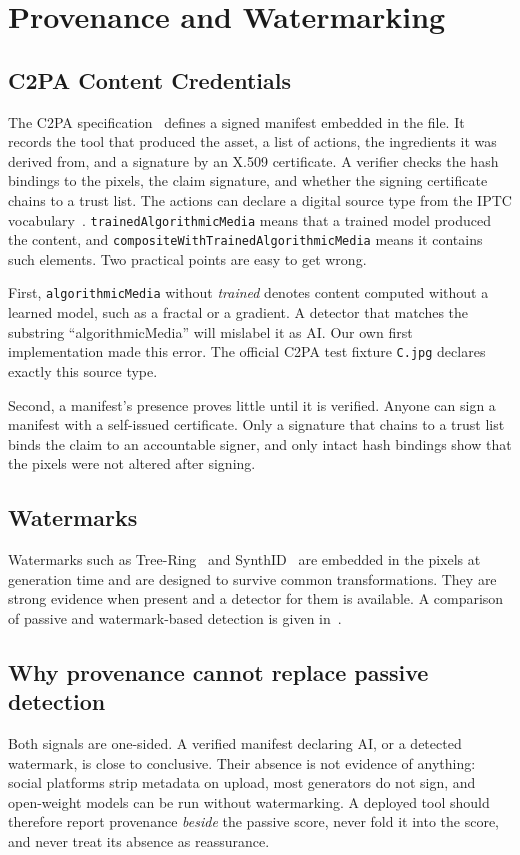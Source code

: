 \documentclass[conference]{IEEEtran}
\begin{document}
\section{Provenance and Watermarking}
\label{sec:provenance}

\subsection{C2PA Content Credentials}
The C2PA specification~\cite{c2pa2026spec} defines a signed manifest
embedded in the file. It records the tool that produced the asset, a list of
actions, the ingredients it was derived from, and a signature by an X.509
certificate. A verifier checks the hash bindings to the pixels, the claim
signature, and whether the signing certificate chains to a trust list. The
actions can declare a digital source type from the IPTC
vocabulary~\cite{iptc2024digitalsourcetype}. \texttt{trainedAlgorithmicMedia}
means that a trained model produced the content, and
\texttt{compositeWithTrainedAlgorithmicMedia} means it contains such
elements. Two practical points are easy to get wrong.

First, \texttt{algorithmicMedia} without \emph{trained} denotes content
computed without a learned model, such as a fractal or a gradient. A
detector that matches the substring ``algorithmicMedia'' will mislabel it as
AI. Our own first implementation made this error. The official C2PA test
fixture \texttt{C.jpg} declares exactly this source type.

Second, a manifest's presence proves little until it is verified. Anyone
can sign a manifest with a self-issued certificate. Only a signature that
chains to a trust list binds the claim to an accountable signer, and only
intact hash bindings show that the pixels were not altered after signing.

\subsection{Watermarks}
Watermarks such as Tree-Ring~\cite{wen2023treering} and
SynthID~\cite{gowal2025synthid} are embedded in the pixels at generation time
and are designed to survive common transformations. They are strong
evidence when present and a detector for them is available. A comparison of
passive and watermark-based detection is given in~\cite{guo2024passive}.

\subsection{Why provenance cannot replace passive detection}
Both signals are one-sided. A verified manifest declaring AI, or a detected
watermark, is close to conclusive. Their absence is not evidence of
anything: social platforms strip metadata on upload, most generators do not
sign, and open-weight models can be run without watermarking. A deployed
tool should therefore report provenance \emph{beside} the passive score,
never fold it into the score, and never treat its absence as reassurance.
\end{document}
